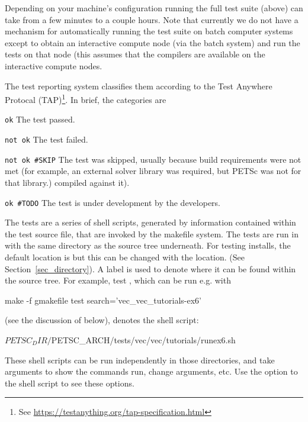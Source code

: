 {{{Depending on your machine's configuration running the full test suite (above) can take from a few minutes to a couple hours.
Note that currently we do not have a mechanism for automatically running the test suite on batch computer systems except to
obtain an interactive compute node (via the batch system) and run the tests on that node (this assumes that the compilers are
available on the interactive compute nodes.

The test reporting system classifies them according to the Test Anywhere
Protocal (TAP)\footnote{See \url{https://testanything.org/tap-specification.html}}.
In brief, the categories are
\begin{tightitemize}
  \item \lstinline{ok}
  \subitem The test passed.
\item \lstinline{not ok}
  \subitem The test failed.
\item \lstinline{not ok #SKIP}
  \subitem The test was skipped, usually because build requirements were not
  met (for example, an external solver library was required, but PETSc was not  for that library.)
  compiled against it).
\item \lstinline{ok #TODO}
  \subitem The test is under development by the developers.
\end{tightitemize}

The tests are a series of shell scripts, generated by information
contained within the test source file, that are invoked by the makefile
system.  The tests are run in
with the same directory as the source tree underneath.
For testing installs, the default location is
 but this can be changed with the  location.
(See Section~\ref{sec_directory}).
A label is used to denote where it can be found within the source tree.
For example, test ,
which can be run e.g. with
\begin{bashlisting}
make -f gmakefile test search='vec_vec_tutorials-ex6'
\end{bashlisting}
(see the discussion of  below), denotes the shell
script:
\begin{bashlisting}
${PETSC_DIR}/${PETSC_ARCH}/tests/vec/vec/tutorials/runex6.sh
\end{bashlisting}
These shell scripts can be run independently in those directories, and
take arguments to show the commands run, change arguments, etc.  Use the
 option to the shell script to see these options.

}}}
